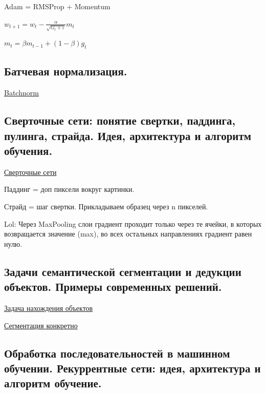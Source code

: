 \documentclass{article}
\begin{document}
Adam = RMSProp + Momentum

$w_{t+1} = w_t - \frac{\alpha}{\sqrt{G_t + \varepsilon}} m_t$

$m_t = \beta m_{t-1} + (1-\beta) g_t$


\subsection{Батчевая нормализация.}

\href{https://neerc.ifmo.ru/wiki/index.php?title=Batch-normalization}{Batchnorm}


\subsection{Сверточные сети: понятие свертки, паддинга, пулинга, страйда. Идея, архитектура
и алгоритм обучения.}

\href{https://neerc.ifmo.ru/wiki/index.php?title=%D0%A1%D0%B2%D0%B5%D1%80%D1%82%D0%BE%D1%87%D0%BD%D1%8B%D0%B5_%D0%BD%D0%B5%D0%B9%D1%80%D0%BE%D0%BD%D0%BD%D1%8B%D0%B5_%D1%81%D0%B5%D1%82%D0%B8}{Сверточные сети}

Паддинг = доп пиксели вокруг картинки.

Страйд = шаг свертки. Прикладываем образец через n пикселей.

Lol: Через MaxPooling слои градиент проходит только через те ячейки,
в которых возвращается значение (max), во всех остальных направлениях
градиент равен нулю.


\subsection{Задачи семантической сегментации и дедукции объектов. Примеры современных
решений.}

\href{https://neerc.ifmo.ru/wiki/index.php?title=%D0%97%D0%B0%D0%B4%D0%B0%D1%87%D0%B0_%D0%BD%D0%B0%D1%85%D0%BE%D0%B6%D0%B4%D0%B5%D0%BD%D0%B8%D1%8F_%D0%BE%D0%B1%D1%8A%D0%B5%D0%BA%D1%82%D0%BE%D0%B2_%D0%BD%D0%B0_%D0%B8%D0%B7%D0%BE%D0%B1%D1%80%D0%B0%D0%B6%D0%B5%D0%BD%D0%B8%D0%B8}{Задача нахождения объектов}

\href{https://neerc.ifmo.ru/wiki/index.php?title=%D0%A1%D0%B5%D0%B3%D0%BC%D0%B5%D0%BD%D1%82%D0%B0%D1%86%D0%B8%D1%8F_%D0%B8%D0%B7%D0%BE%D0%B1%D1%80%D0%B0%D0%B6%D0%B5%D0%BD%D0%B8%D0%B9}{Сегментация конкретно}


\subsection{Обработка последовательностей в машинном обучении. Рекуррентные сети:
идея, архитектура и алгоритм обучение.}
\end{document}
